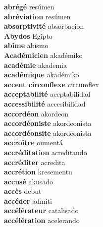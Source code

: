 \textbf{ abrégé  } resúmen \\
\textbf{ abréviation  } resúmen \\
\textbf{ absorptivité  } absorbacion \\
\textbf{ Abydos  } Egipto \\
\textbf{ abîme  } abismo \\
\textbf{ Académicien  } akadémiko \\
\textbf{ académie  } akademia \\
\textbf{ académique  } akadémiko \\
\textbf{ accent circonflexe  } circumflex \\
\textbf{ acceptabilité  } aceptabilidad \\
\textbf{ accessibilité  } accesibilidad \\
\textbf{ accordéon  } akordeon \\
\textbf{ accordéoniste  } akordeonista \\
\textbf{ accordéonsite  } akordeonista \\
\textbf{ accroître  } oumentá \\
\textbf{ accréditation  } acreditando \\
\textbf{ accréditer  } acredita \\
\textbf{ accrétion  } kresementu \\
\textbf{ accusé  } akusado \\
\textbf{ accès  } debut \\
\textbf{ accéder  } admiti \\
\textbf{ accélérateur  } catalisado \\
\textbf{ accélération  } acelerando \\
